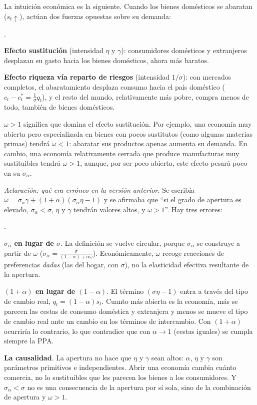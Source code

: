 \documentclass[10pt,a4paper]{article}
\newcounter{numitem}
\newenvironment{lnum}
      {\begin{list}{\arabic{numitem}.}{%
          \usecounter{numitem}%
          \setlength{\leftmargin}{1cm}%
          \setlength{\parskip}{3pt}%
          \setlength{\itemsep}{0pt}%
          \setlength{\parsep}{0pt}%
      }}
      {\end{list}}
\begin{document}
La intuición económica es la siguiente. Cuando los bienes domésticos se abaratan ($s_t\uparrow$), actúan dos fuerzas opuestas sobre su demanda:
\begin{lnum}
    \item \textbf{Efecto sustitución} (intensidad $\eta$ y $\gamma$): consumidores domésticos y extranjeros desplazan su gasto hacia los bienes domésticos, ahora más baratos.
    \item \textbf{Efecto riqueza vía reparto de riesgos} (intensidad $1/\sigma$): con mercados completos, el abaratamiento desplaza consumo hacia el país doméstico ($c_t-c_t^*=\frac{1}{\sigma}q_t$), y el resto del mundo, relativamente más pobre, compra menos de todo, también de bienes domésticos.
\end{lnum}
$\omega>1$ significa que domina el efecto sustitución. Por ejemplo, una economía muy abierta pero especializada en bienes con pocos sustitutos (como algunas materias primas) tendrá $\omega<1$: abaratar sus productos apenas aumenta su demanda. En cambio, una economía relativamente cerrada que produce manufacturas muy sustituibles tendrá $\omega>1$, aunque, por ser poco abierta, este efecto pesará poco en su $\sigma_\alpha$.

\textit{Aclaración: qué era erróneo en la versión anterior.} Se escribía $\omega=\sigma_\alpha\gamma+(1+\alpha)(\sigma_\alpha\eta-1)$ y se afirmaba que ``si el grado de apertura es elevado, $\sigma_\alpha<\sigma$, $\eta$ y $\gamma$ tendrán valores altos, y $\omega>1$''. Hay tres errores:
\begin{lnum}
    \item \textbf{$\sigma_\alpha$ en lugar de $\sigma$}. La definición se vuelve circular, porque $\sigma_\alpha$ se construye a partir de $\omega$ ($\sigma_\alpha=\frac{\sigma}{(1-\alpha)+\alpha\omega}$). Económicamente, $\omega$ recoge reacciones de preferencias \textit{dadas} (las del hogar, con $\sigma$), no la elasticidad efectiva resultante de la apertura.
    \item \textbf{$(1+\alpha)$ en lugar de $(1-\alpha)$}. El término $(\sigma\eta-1)$ entra a través del tipo de cambio real, $q_t=(1-\alpha)s_t$. Cuanto más abierta es la economía, más se parecen las cestas de consumo doméstica y extranjera y menos se mueve el tipo de cambio real ante un cambio en los términos de intercambio. Con $(1+\alpha)$ ocurriría lo contrario, lo que contradice que con $\alpha\to1$ (cestas iguales) se cumpla siempre la PPA.
    \item \textbf{La causalidad}. La apertura no hace que $\eta$ y $\gamma$ sean altos: $\alpha$, $\eta$ y $\gamma$ son parámetros primitivos e independientes. Abrir una economía cambia cuánto comercia, no lo sustituibles que les parecen los bienes a los consumidores. Y $\sigma_\alpha<\sigma$ no es una consecuencia de la apertura por sí sola, sino de la combinación de apertura y $\omega>1$.
\end{lnum}
\end{document}
